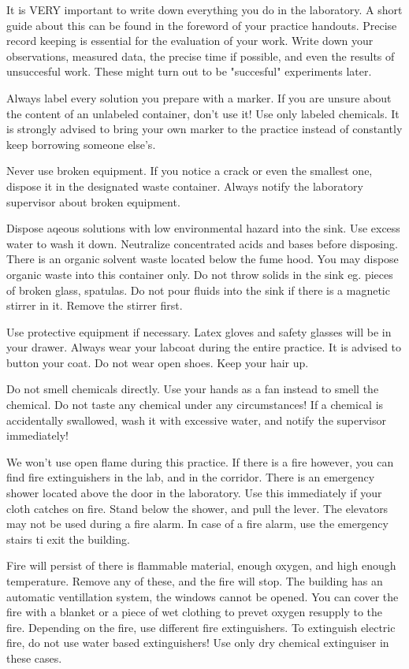 It is VERY important to write down everything you do in the laboratory. A short guide about this can be found in the foreword of your practice handouts. Precise record keeping is essential for the evaluation of your work. Write down your observations, measured data, the precise time if possible, and even the results of unsuccesful work. These might turn out to be "succesful" experiments later.

Always label every solution you prepare with a marker. If you are unsure about the content of an unlabeled container, don't use it! Use only labeled chemicals. It is strongly advised to bring your own marker to the practice instead of constantly keep borrowing someone else's.

Never use broken equipment. If you notice a crack or even the smallest one, dispose it in the designated waste container. Always notify the laboratory supervisor about broken equipment.

Dispose aqeous solutions with low environmental hazard into the sink. Use excess water to wash it down. Neutralize concentrated acids and bases before disposing. There is an organic solvent waste located below the fume hood. You may dispose organic waste into this container only. Do not throw solids in the sink eg. pieces of broken glass, spatulas. Do not pour fluids into the sink if there is a magnetic stirrer in it. Remove the stirrer first.

Use protective equipment if necessary. Latex gloves and  safety glasses will be in your drawer. Always wear your labcoat during the entire practice. It is advised to button your coat. Do not wear open shoes. Keep your hair up.

Do not smell chemicals directly. Use your hands as a fan instead to smell the chemical. Do not taste any chemical under any circumstances! If a chemical is accidentally swallowed, wash it with excessive water, and notify the supervisor immediately!

We won't use open flame during this practice. If there is a fire however, you can find fire extinguishers in the lab, and in the corridor. There is an emergency shower located above the door in the laboratory. Use this immediately if your cloth catches on fire. Stand below the shower, and pull the lever. The elevators may not be used during a fire alarm. In case of a fire alarm, use the emergency stairs ti exit the building.

Fire will persist of there is flammable material, enough oxygen, and high enough temperature. Remove any of these, and the fire will stop. The building has an automatic ventillation system, the windows cannot be opened. You can cover the fire with a blanket or a piece of wet clothing to prevet oxygen resupply to the fire. Depending on the fire, use different fire extinguishers. To extinguish electric fire, do not use water based extinguishers! Use only dry chemical extinguiser in these cases.

